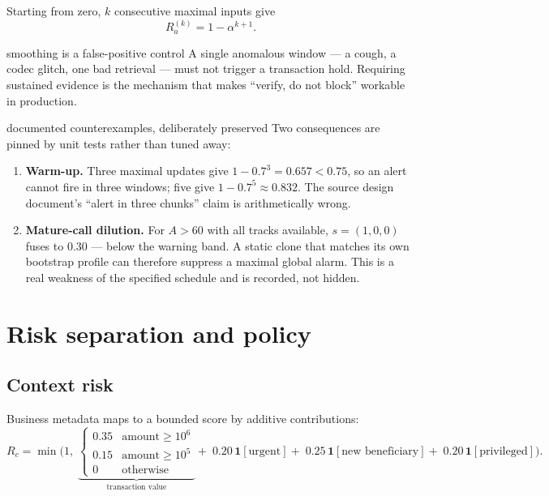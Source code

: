 \documentclass[11pt,a4paper]{article}
\begin{document}
Starting from zero, $k$ consecutive maximal inputs give
\begin{equation}
R_a^{(k)} = 1 - \alpha^{k+1}.
\end{equation}

\begin{whybox}{smoothing is a false-positive control}
A single anomalous window --- a cough, a codec glitch, one bad retrieval --- must not
trigger a transaction hold. Requiring sustained evidence is the mechanism that makes
``verify, do not block'' workable in production.
\end{whybox}

\begin{warnbox}{documented counterexamples, deliberately preserved}
Two consequences are pinned by unit tests rather than tuned away:
\begin{enumerate}[nosep,leftmargin=1.4em]
\item \textbf{Warm-up.} Three maximal updates give $1-0.7^3 = 0.657 < 0.75$, so an alert
cannot fire in three windows; five give $1-0.7^5 \approx 0.832$. The source design
document's ``alert in three chunks'' claim is arithmetically wrong.
\item \textbf{Mature-call dilution.} For $A > 60$ with all tracks available,
$s = (1,0,0)$ fuses to $0.30$ --- below the warning band. A static clone that matches
its own bootstrap profile can therefore suppress a maximal global alarm. This is a real
weakness of the specified schedule and is recorded, not hidden.
\end{enumerate}
\end{warnbox}

\section{Risk separation and policy}

\subsection{Context risk}

Business metadata maps to a bounded score by additive contributions:
\begin{equation}
R_c = \min\Big(1,\;
\underbrace{\begin{cases}0.35 & \text{amount} \ge 10^6\\ 0.15 & \text{amount} \ge 10^5\\ 0 & \text{otherwise}\end{cases}}_{\text{transaction value}}
+\; 0.20\,\mathbf{1}[\text{urgent}]
+\; 0.25\,\mathbf{1}[\text{new beneficiary}]
+\; 0.20\,\mathbf{1}[\text{privileged}]\Big).
\end{equation}
\end{document}
